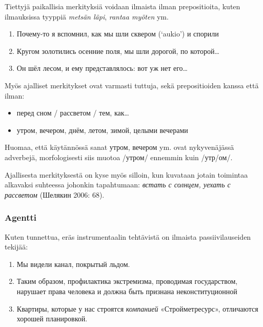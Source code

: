 \documentclass[]{scrartcl}
\providecommand{\tightlist}{%
  \setlength{\itemsep}{0pt}\setlength{\parskip}{0pt}}
\begin{document}
Tiettyjä paikallisia merkityksiä voidaan ilmaista ilman prepositioita,
kuten ilmauksissa tyyppiä \emph{metsän läpi}, \emph{rantaa myöten} ym.

\begin{enumerate}
\def\labelenumi{(\arabic{enumi})}
\setcounter{enumi}{132}
\tightlist
\item
  Почему-то я вспомнил, как мы шли сквером (`aukio') и спорили
\item
  Кругом золотились осенние поля, мы шли дорогой, по которой\ldots{}
\item
  Он шёл лесом, и ему представлялось: вот уж нет его\ldots{}
\end{enumerate}

Myös ajalliset merkitykset ovat varmasti tuttuja, sekä prepositioiden
kanssa että ilman:

\begin{itemize}
\tightlist
\item
  перед сном / рассветом / тем, как\ldots{}
\item
  утром, вечером, днём, летом, зимой, целыми вечерами
\end{itemize}

Huomaa, että käytännössä sanat утром, вечером ym. ovat nykyvenäjässä
adverbejä, morfologisesti siis muotoa /утром/ ennemmin kuin /утр/ом/.

Ajallisesta merkityksestä on kyse myös silloin, kun kuvataan jotain
toimintaa alkavaksi suhteessa johonkin tapahtumaan: \emph{встать с
солнцем, уехать с рассветом} (Шелякин 2006: 68).

\subsubsection{Agentti}\label{agentti}

Kuten tunnettua, eräs instrumentaalin tehtävistä on ilmaista
passiivilauseiden tekijää:

\begin{enumerate}
\def\labelenumi{(\arabic{enumi})}
\setcounter{enumi}{135}
\tightlist
\item
  Мы видели канал, покрытый льдом.
\item
  Таким образом, профилактика экстремизма, проводимая государством,
  нарушает права человека и должна быть признана неконституционной
\item
  Квартиры, которые у нас строятся \emph{компанией} «Стройметресурс»,
  отличаются хорошей планировкой.
\end{enumerate}
\end{document}
